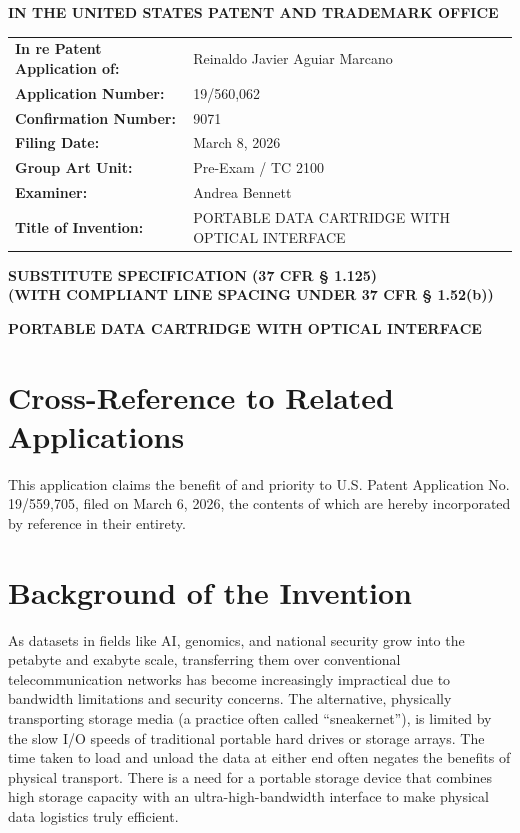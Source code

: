 \documentclass[11pt,letterpaper]{article}
\begin{document}
\thispagestyle{empty}

\begin{center}
    \large\textbf{IN THE UNITED STATES PATENT AND TRADEMARK OFFICE} \\
\end{center}

\vspace{0.2cm}
\noindent\begin{tabular}{p{2.3in}p{4.0in}}
\textbf{In re Patent Application of:} & Reinaldo Javier Aguiar Marcano \\
\textbf{Application Number:} & 19/560,062 \\
\textbf{Confirmation Number:} & 9071 \\
\textbf{Filing Date:} & March 8, 2026 \\
\textbf{Group Art Unit:} & Pre-Exam / TC 2100 \\
\textbf{Examiner:} & Andrea Bennett \\
\textbf{Title of Invention:} & PORTABLE DATA CARTRIDGE WITH OPTICAL INTERFACE \\
\end{tabular}

\vspace{0.6cm}
\begin{center}
    \textbf{\large SUBSTITUTE SPECIFICATION (37 CFR \S{} 1.125)} \\
    \textbf{(WITH COMPLIANT LINE SPACING UNDER 37 CFR \S{} 1.52(b))}
\end{center}

\vspace{0.4cm}

\begin{center}
    \textbf{\large PORTABLE DATA CARTRIDGE WITH OPTICAL INTERFACE}
\end{center}

\section*{Cross-Reference to Related Applications}
This application claims the benefit of and priority to U.S. Patent Application No. 19/559,705, filed on March 6, 2026, the contents of which are hereby incorporated by reference in their entirety.

\section*{Background of the Invention}
As datasets in fields like AI, genomics, and national security grow into the petabyte and exabyte scale, transferring them over conventional telecommunication networks has become increasingly impractical due to bandwidth limitations and security concerns. The alternative, physically transporting storage media (a practice often called ``sneakernet''), is limited by the slow I/O speeds of traditional portable hard drives or storage arrays. The time taken to load and unload the data at either end often negates the benefits of physical transport. There is a need for a portable storage device that combines high storage capacity with an ultra-high-bandwidth interface to make physical data logistics truly efficient.
\end{document}
